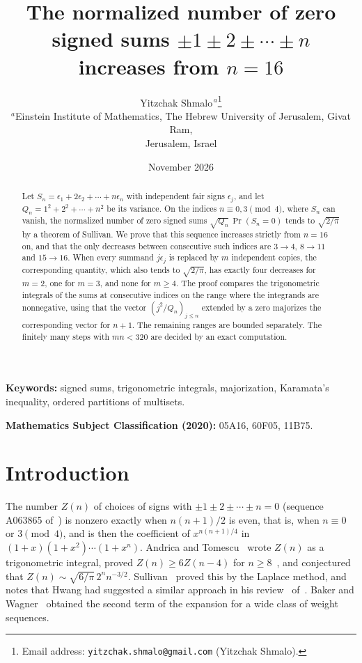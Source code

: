 \documentclass[11pt]{article}
\title{The normalized number of zero signed sums $\pm1\pm2\pm\cdots\pm n$ increases from $n=16$}
\author{Yitzchak Shmalo$^{\,a}$\thanks{Email address:
\texttt{yitzchak.shmalo@gmail.com} (Yitzchak Shmalo).}\\
{\small $^{a}$Einstein Institute of Mathematics, The Hebrew University of
Jerusalem, Givat Ram,}\\
{\small Jerusalem, Israel}}
\date{November 2026}
\theoremstyle{remark}
\begin{document}
\maketitle

\begin{abstract}
Let $S_n=\epsilon_1+2\epsilon_2+\cdots+n\epsilon_n$ with independent fair signs $\epsilon_j$, and let $Q_n=1^2+2^2+\cdots+n^2$ be its variance. On the indices $n\equiv0,3\pmod 4$, where $S_n$ can vanish, the normalized number of zero signed sums $\sqrt{Q_n}\,\Pr(S_n=0)$ tends to $\sqrt{2/\pi}$ by a theorem of Sullivan. We prove that this sequence increases strictly from $n=16$ on, and that the only decreases between consecutive such indices are $3\to4$, $8\to11$ and $15\to16$. When every summand $j\epsilon_j$ is replaced by $m$ independent copies, the corresponding quantity, which also tends to $\sqrt{2/\pi}$, has exactly four decreases for $m=2$, one for $m=3$, and none for $m\ge4$. The proof compares the trigonometric integrals of the sums at consecutive indices on the range where the integrands are nonnegative, using that the vector $(j^2/Q_n)_{j\le n}$ extended by a zero majorizes the corresponding vector for $n+1$. The remaining ranges are bounded separately. The finitely many steps with $mn<320$ are decided by an exact computation.
\end{abstract}

\noindent\textbf{Keywords:} signed sums, trigonometric integrals, majorization, Karamata's inequality, ordered partitions of multisets.

\noindent\textbf{Mathematics Subject Classification (2020):} 05A16, 60F05, 11B75.

\section{Introduction}

The number $Z(n)$ of choices of signs with $\pm1\pm2\pm\cdots\pm n=0$ (sequence A063865 of~\cite{OEIS}) is nonzero exactly when $n(n+1)/2$ is even, that is, when $n\equiv0$ or $3\pmod 4$, and is then the coefficient of $x^{n(n+1)/4}$ in $(1+x)(1+x^2)\cdots(1+x^n)$. Andrica and Tomescu~\cite{AT02} wrote $Z(n)$ as a trigonometric integral, proved $Z(n)\ge6Z(n-4)$ for $n\ge8$~\cite[Theorem~2.3]{AT02}, and conjectured~\cite[Conjecture~2.6]{AT02} that $Z(n)\sim\sqrt{6/\pi}\,2^nn^{-3/2}$. Sullivan~\cite{Sul13} proved this by the Laplace method, and notes that Hwang had suggested a similar approach in his review~\cite{Hwa03} of~\cite{AT02}. Baker and Wagner~\cite{BW16} obtained the second term of the expansion for a wide class of weight sequences.
\end{document}
